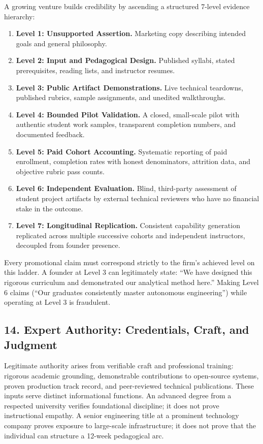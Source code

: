 A growing venture builds credibility by ascending a structured 7-level evidence hierarchy:
\begin{enumerate}
\item \textbf{Level 1: Unsupported Assertion.} Marketing copy describing intended goals and general philosophy.
\item \textbf{Level 2: Input and Pedagogical Design.} Published syllabi, stated prerequisites, reading lists, and instructor resumes.
\item \textbf{Level 3: Public Artifact Demonstrations.} Live technical teardowns, published rubrics, sample assignments, and unedited walkthroughs.
\item \textbf{Level 4: Bounded Pilot Validation.} A closed, small-scale pilot with authentic student work samples, transparent completion numbers, and documented feedback.
\item \textbf{Level 5: Paid Cohort Accounting.} Systematic reporting of paid enrollment, completion rates with honest denominators, attrition data, and objective rubric pass counts.
\item \textbf{Level 6: Independent Evaluation.} Blind, third-party assessment of student project artifacts by external technical reviewers who have no financial stake in the outcome.
\item \textbf{Level 7: Longitudinal Replication.} Consistent capability generation replicated across multiple successive cohorts and independent instructors, decoupled from founder presence.
\end{enumerate}

Every promotional claim must correspond strictly to the firm's achieved level on this ladder. A founder at Level 3 can legitimately state: ``We have designed this rigorous curriculum and demonstrated our analytical method here.'' Making Level 6 claims (``Our graduates consistently master autonomous engineering'') while operating at Level 3 is fraudulent.

\subsection*{14. Expert Authority: Credentials, Craft, and Judgment}

Legitimate authority arises from verifiable craft and professional training: rigorous academic grounding, demonstrable contributions to open-source systems, proven production track record, and peer-reviewed technical publications. These inputs serve distinct informational functions. An advanced degree from a respected university verifies foundational discipline; it does not prove instructional empathy. A senior engineering title at a prominent technology company proves exposure to large-scale infrastructure; it does not prove that the individual can structure a 12-week pedagogical arc.

